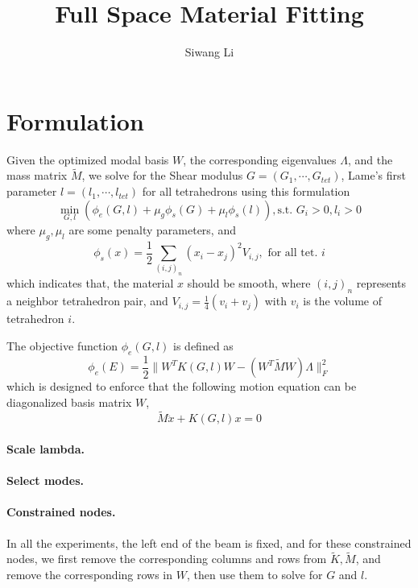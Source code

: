 \documentclass[9pt,twocolumn]{extarticle}
\author{Siwang Li}
\title{Full Space Material Fitting}
\begin{document}
\maketitle

\setlength{\parskip}{0.5ex}

\section{Formulation}
Given the optimized modal basis $W$, the corresponding eigenvalues $\Lambda$,
and the mass matrix $\tilde{M}$, we solve for the Shear modulus
$G=(G_1,\cdots,G_{tet})$, Lame's first parameter $l=(l_1,\cdots,l_{tet})$ for
all tetrahedrons using this formulation
\begin{equation} \label{all}
  \min_{G,l}(\phi_e(G,l)+\mu_{g}\phi_s(G)+\mu_{l}\phi_s(l)), \mbox{s.t. } G_i>0, l_i>0
\end{equation}
where $\mu_g, \mu_l$ are some penalty parameters, and
\begin{equation} \label{smooth}
  \phi_s(x) = \frac{1}{2}\sum_{(i,j)_{n}}(x_i-x_j)^2V_{i,j}, \mbox{ for all
    tet. }i
\end{equation}
which indicates that, the material $x$ should be smooth, where $(i,j)_{n}$ represents a
neighbor tetrahedron pair, and $V_{i,j}=\frac{1}{4}(v_i+v_j)$ with $v_i$ is the
volume of tetrahedron $i$. 

The objective function $\phi_e(G,l)$ is defined as
\begin{equation} \label{diag_k}
  \phi_e(E) = \frac{1}{2}\|{W}^TK(G,l){W}-({W}^T\tilde{M}{W})\Lambda\|_F^2
\end{equation}
which is designed to enforce that the following motion equation can be
diagonalized basis matrix $W$,
\begin{equation} \label{motion_eq}
  \tilde{M}\ddot{x} + K(G,l)x = 0
\end{equation}

\paragraph{Scale lambda.}

\paragraph{Select modes.}

\paragraph{Constrained nodes.}
In all the experiments, the left end of the beam is fixed, and for these
constrained nodes, we first remove the corresponding columns and rows from
$\tilde{K}, \tilde{M}$, and remove the corresponding rows in $W$, then use
them to solve for $G$ and $l$.
\end{document}
